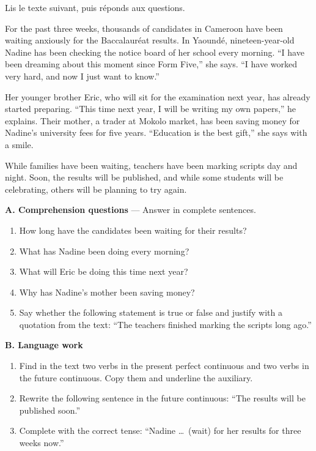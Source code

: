\documentclass[11pt]{article}
\begin{document}
\begin{exercice}
Lis le texte suivant, puis réponds aux questions.

\begin{textebox}
For the past three weeks, thousands of candidates in Cameroon have been waiting anxiously for the Baccalauréat results. In Yaoundé, nineteen-year-old Nadine has been checking the notice board of her school every morning. “I have been dreaming about this moment since Form Five,” she says. “I have worked very hard, and now I just want to know.”

Her younger brother Eric, who will sit for the examination next year, has already started preparing. “This time next year, I will be writing my own papers,” he explains. Their mother, a trader at Mokolo market, has been saving money for Nadine's university fees for five years. “Education is the best gift,” she says with a smile.

While families have been waiting, teachers have been marking scripts day and night. Soon, the results will be published, and while some students will be celebrating, others will be planning to try again.
\end{textebox}

\textbf{A. Comprehension questions} — Answer in complete sentences.
\begin{enumerate}
\item How long have the candidates been waiting for their results?
\item What has Nadine been doing every morning?
\item What will Eric be doing this time next year?
\item Why has Nadine's mother been saving money?
\item Say whether the following statement is true or false and justify with a quotation from the text: “The teachers finished marking the scripts long ago.”
\end{enumerate}

\textbf{B. Language work}
\begin{enumerate}
\item Find in the text two verbs in the present perfect continuous and two verbs in the future continuous. Copy them and underline the auxiliary.
\item Rewrite the following sentence in the future continuous: “The results will be published soon.”
\item Complete with the correct tense: “Nadine \ldots\ (wait) for her results for three weeks now.”
\end{enumerate}
\end{exercice}
\end{document}
